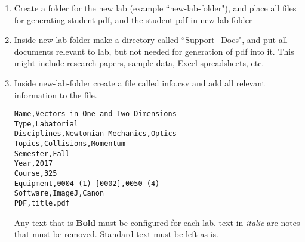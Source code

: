 \documentclass[justified]{book}
\begin{document}
\begin{enumerate}
\item Create a folder for the new lab (example ``new-lab-folder"), and place all files for generating student pdf, and the student pdf in new-lab-folder
\item Inside new-lab-folder make a directory called ``Support\_Docs", and put all documents relevant to lab, but not needed for generation of pdf into it. This might include research papers, sample data, Excel spreadsheets, etc.
\item Inside new-lab-folder create a file called info.csv and add all relevant information to the file.\\


	\begin{lstlisting}[backgroundcolor = \color{light-gray},
					caption = The file info.csv needs to be in this form. See below for more details
                   %language = C,
                   xleftmargin = 2cm,
                   framexleftmargin = 1em
                   ]
Name,Vectors-in-One-and-Two-Dimensions
Type,Labatorial
Disciplines,Newtonian Mechanics,Optics
Topics,Collisions,Momentum
Semester,Fall
Year,2017
Course,325
Equipment,0004-(1)-[0002],0050-(4)
Software,ImageJ,Canon
PDF,title.pdf
\end{lstlisting}


Any text that is \textbf{Bold} must be configured for each lab. text in \textit{italic} are notes that must be removed. Standard text must be left as is.


\end{enumerate}
\end{document}
